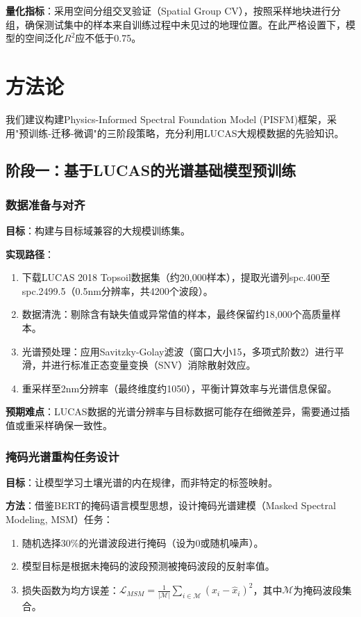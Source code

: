 \documentclass[12pt, a4paper]{article}
\begin{document}
\textbf{量化指标}：采用空间分组交叉验证（Spatial Group CV），按照采样地块进行分组，确保测试集中的样本来自训练过程中未见过的地理位置。在此严格设置下，模型的空间泛化$R^2$应不低于0.75。

\newpage
\section{方法论}

我们建议构建Physics-Informed Spectral Foundation Model (PISFM)框架，采用"预训练-迁移-微调"的三阶段策略，充分利用LUCAS大规模数据的先验知识。

\subsection{阶段一：基于LUCAS的光谱基础模型预训练}

\subsubsection{数据准备与对齐}
\textbf{目标}：构建与目标域兼容的大规模训练集。

\textbf{实现路径}：
\begin{enumerate}
    \item 下载LUCAS 2018 Topsoil数据集（约20,000样本），提取光谱列spc.400至spc.2499.5（0.5nm分辨率，共4200个波段）。
    \item 数据清洗：剔除含有缺失值或异常值的样本，最终保留约18,000个高质量样本。
    \item 光谱预处理：应用Savitzky-Golay滤波（窗口大小15，多项式阶数2）进行平滑，并进行标准正态变量变换（SNV）消除散射效应。
    \item 重采样至2nm分辨率（最终维度约1050），平衡计算效率与光谱信息保留。
\end{enumerate}

\textbf{预期难点}：LUCAS数据的光谱分辨率与目标数据可能存在细微差异，需要通过插值或重采样确保一致性。

\subsubsection{掩码光谱重构任务设计}
\textbf{目标}：让模型学习土壤光谱的内在规律，而非特定的标签映射。

\textbf{方法}：借鉴BERT的掩码语言模型思想，设计掩码光谱建模（Masked Spectral Modeling, MSM）任务：
\begin{enumerate}
    \item 随机选择30\%的光谱波段进行掩码（设为0或随机噪声）。
    \item 模型目标是根据未掩码的波段预测被掩码波段的反射率值。
    \item 损失函数为均方误差：$\mathcal{L}_{MSM} = \frac{1}{|\mathcal{M}|} \sum_{i \in \mathcal{M}} (x_i - \hat{x}_i)^2$，其中$\mathcal{M}$为掩码波段集合。
\end{enumerate}
\end{document}
